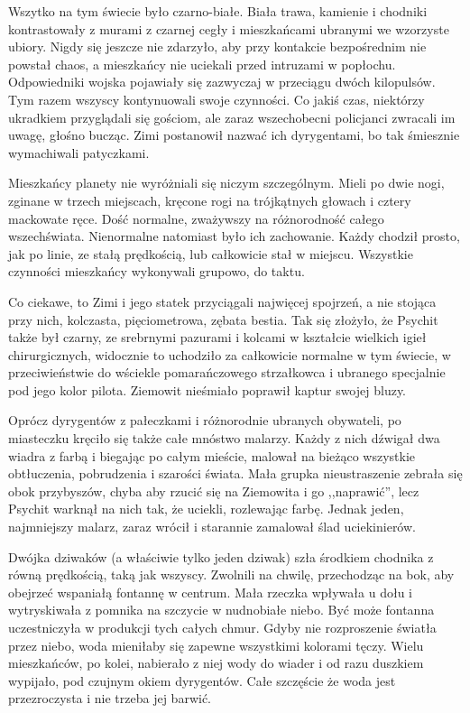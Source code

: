Wszytko na tym świecie było czarno-białe. Biała trawa, kamienie i chodniki kontrastowały z murami z czarnej cegły i mieszkańcami ubranymi we wzorzyste ubiory.
Nigdy się jeszcze nie zdarzyło, aby przy kontakcie bezpośrednim nie powstał chaos, a mieszkańcy nie uciekali przed intruzami w popłochu. 
Odpowiedniki wojska pojawiały się zazwyczaj w przeciągu dwóch kilopulsów.
Tym razem wszyscy kontynuowali swoje czynności.
Co jakiś czas, niektórzy ukradkiem przyglądali się gościom, ale zaraz wszechobecni policjanci zwracali im uwagę, głośno bucząc.
Zimi postanowił nazwać ich dyrygentami, bo tak śmiesznie wymachiwali patyczkami.

Mieszkańcy planety nie wyróżniali się niczym szczególnym. Mieli po dwie nogi, zginane w trzech miejscach, kręcone rogi na trójkątnych głowach i cztery mackowate ręce.
Dość normalne, zważywszy na różnorodność całego wszechświata.
Nienormalne natomiast było ich zachowanie. Każdy chodził prosto, jak po linie, ze stałą prędkością, lub całkowicie stał w miejscu.
Wszystkie czynności mieszkańcy wykonywali grupowo, do taktu.

Co ciekawe, to Zimi i jego statek przyciągali najwięcej spojrzeń, a nie stojąca przy nich, kolczasta, pięciometrowa, zębata bestia.
Tak się złożyło, że Psychit także był czarny, ze srebrnymi pazurami i kolcami w kształcie wielkich igieł chirurgicznych, 
widocznie to uchodziło za całkowicie normalne w tym świecie, w przeciwieństwie do wściekle pomarańczowego strzałkowca i
ubranego specjalnie pod jego kolor pilota. Ziemowit nieśmiało poprawił kaptur swojej bluzy.

Oprócz dyrygentów z pałeczkami i różnorodnie ubranych obywateli, po miasteczku kręciło się także całe mnóstwo malarzy.
Każdy z nich dźwigał dwa wiadra z farbą i biegając po całym mieście, malował na bieżąco wszystkie obtłuczenia, pobrudzenia i szarości świata.
Mała grupka nieustraszenie zebrała się obok przybyszów, chyba aby rzucić się na Ziemowita i go ,,naprawić'', lecz Psychit warknął na nich tak, że uciekli, rozlewając farbę.
Jednak jeden, najmniejszy malarz, zaraz wrócił i starannie zamalował ślad uciekinierów.

\divider{}

Dwójka dziwaków (a właściwie tylko jeden dziwak) szła środkiem chodnika z równą prędkością, taką jak wszyscy.
Zwolnili na chwilę, przechodząc na bok, aby obejrzeć wspaniałą fontannę w centrum.
Mała rzeczka wpływała u dołu i wytryskiwała z pomnika na szczycie w nudnobiałe niebo.
Być może fontanna uczestniczyła w produkcji tych całych chmur.
Gdyby nie rozproszenie światła przez niebo, woda mieniłaby się zapewne wszystkimi kolorami tęczy.
Wielu mieszkańców, po kolei, nabierało z niej wody do wiader i od razu duszkiem wypijało, pod czujnym okiem dyrygentów.
Całe szczęście że woda jest przezroczysta i nie trzeba jej barwić.

